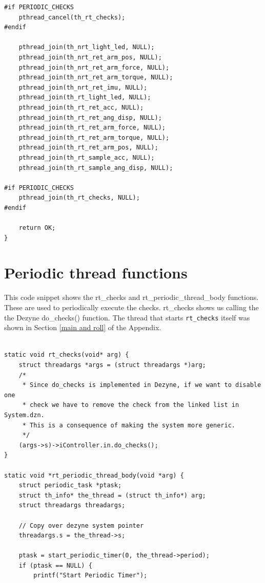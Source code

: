 \documentclass[12pt]{scrreprt}
\begin{document}
\begin{appendices}
\begin{verbatim}
#if PERIODIC_CHECKS
    pthread_cancel(th_rt_checks);
#endif

    pthread_join(th_nrt_light_led, NULL);
    pthread_join(th_nrt_ret_arm_pos, NULL);
    pthread_join(th_nrt_ret_arm_force, NULL);
    pthread_join(th_nrt_ret_arm_torque, NULL);
    pthread_join(th_nrt_ret_imu, NULL);
    pthread_join(th_rt_light_led, NULL);
    pthread_join(th_rt_ret_acc, NULL);
    pthread_join(th_rt_ret_ang_disp, NULL);
    pthread_join(th_rt_ret_arm_force, NULL);
    pthread_join(th_rt_ret_arm_torque, NULL);
    pthread_join(th_rt_ret_arm_pos, NULL);
    pthread_join(th_rt_sample_acc, NULL);
    pthread_join(th_rt_sample_ang_disp, NULL);

#if PERIODIC_CHECKS
    pthread_join(th_rt_checks, NULL);
#endif

    return OK;
}
\end{verbatim}

\section{Periodic thread functions}
This code snippet shows the rt\_checks and rt\_periodic\_thread\_body functions. These are used to periodically execute the checks. rt\_checks shows us calling the the Dezyne do\_checks() function. The thread that starts \texttt{rt\_checks} itself was shown in Section \ref{main and roll} of the Appendix.
               
\begin{verbatim}

static void rt_checks(void* arg) {
    struct threadargs *args = (struct threadargs *)arg;
    /*
     * Since do_checks is implemented in Dezyne, if we want to disable one
     * check we have to remove the check from the linked list in System.dzn.
     * This is a consequence of making the system more generic. 
     */
    (args->s)->iController.in.do_checks();
}

static void *rt_periodic_thread_body(void *arg) {
    struct periodic_task *ptask;
    struct th_info* the_thread = (struct th_info*) arg;
    struct threadargs threadargs;

    // Copy over dezyne system pointer
    threadargs.s = the_thread->s;

    ptask = start_periodic_timer(0, the_thread->period);
    if (ptask == NULL) {
        printf("Start Periodic Timer");


\end{verbatim}
\end{appendices}
\end{document}
